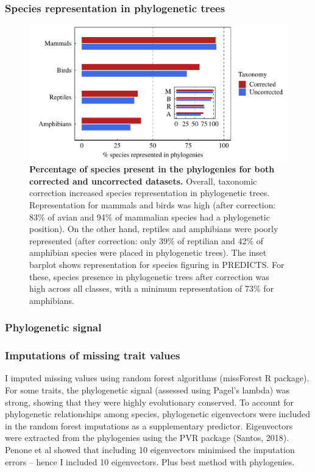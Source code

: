 \subsubsection{Species representation in phylogenetic trees}
\begin{figure}[h!]
\centering
\includegraphics[scale=0.7]{figures/chapter2/Species_representation_phylo}
\caption {\textbf{Percentage of species present in the phylogenies for both corrected and uncorrected datasets.} Overall, taxonomic correction increased species representation in phylogenetic trees. Representation for mammals and birds was high (after correction: 83\% of avian and 94\% of mammalian species had a phylogenetic position). On the other hand, reptiles and amphibians were poorly represented (after correction: only 39\% of reptilian and 42\% of amphibian species were placed in phylogenetic trees). The inset barplot shows representation for species figuring in PREDICTS. For these, species presence in phylogenetic trees after correction was high across all classes, with a minimum representation of 73\% for amphibians.}
\end{figure}

\subsubsection{Phylogenetic signal}

\subsubsection{Imputations of missing trait values}

I imputed missing values using random forest algorithms (missForest R package). For some traits, the phylogenetic signal (assessed using Pagel’s lambda) was strong, showing that they were highly evolutionary conserved. To account for phylogenetic relationships among species, phylogenetic eigenvectors were included in the random forest imputations as a supplementary predictor. Eigenvectors were extracted from the phylogenies using the PVR package (Santos, 2018). Penone et al showed that including 10 eigenvectors minimised the imputation errors – hence I included 10 eigenvectors. Plus best method with phylogenies.

